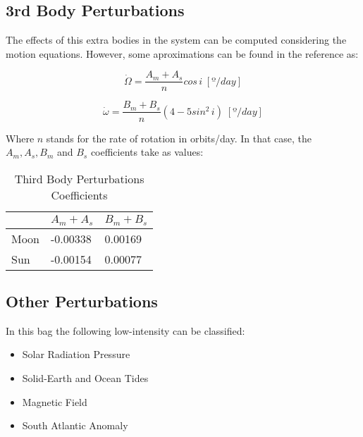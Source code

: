\subsection{3rd Body Perturbations}
The effects of this extra bodies in the system can be computed considering the motion equations. However, some aproximations can be found in the reference as:

\begin{equation}
\dot{\Omega} = \frac{A_{m}+A_{s}}{n} cos \,i \;[º/day]
\end{equation}

\begin{equation}
\dot{\omega} = \frac{B_{m}+B_{s}}{n} (4 - 5sin^2 \,i)\;[º/day]
\end{equation}

Where $n$ stands for the rate of rotation in orbits/day. In that case, the $A_{m}, A_{s}, B_{m}$ and $B_{s}$ coefficients take as values:

\begin{table}[H]
\centering
\begin{tabular}{l|l|l|}
\cline{2-3}
                           & $A_{m}+A_{s}$ & $B_{m}+B_{s}$ \\ \hline
\multicolumn{1}{|l|}{Moon} & -0.00338      & 0.00169       \\ \hline
\multicolumn{1}{|l|}{Sun}  & -0.00154      & 0.00077       \\ \hline
\end{tabular}
\caption{Third Body Perturbations Coefficients}
\end{table}

\subsection{Other Perturbations}
In this bag the following low-intensity can be classified:

\begin{itemize}
\item Solar Radiation Pressure
\item Solid-Earth and Ocean Tides
\item Magnetic Field
\item South Atlantic Anomaly
\end{itemize}